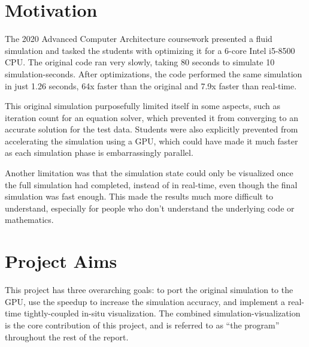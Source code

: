 \section{Motivation}
The 2020 Advanced Computer Architecture coursework presented a fluid simulation and tasked the students with optimizing it for a 6-core Intel i5-8500 CPU\cite{modules:CS257Coursework}.
The original code ran very slowly, taking 80 seconds to simulate 10 simulation-seconds.
After optimizations, the code performed the same simulation in just 1.26 seconds, 64x faster than the original and 7.9x faster than real-time\cite{modules:aca257submission}.

This original simulation purposefully limited itself in some aspects, such as iteration count for an equation solver, which prevented it from converging to an accurate solution for the test data.
Students were also explicitly prevented from accelerating the simulation using a GPU, which could have made it much faster as each simulation phase is embarrassingly parallel.

Another limitation was that the simulation state could only be visualized once the full simulation had completed,
instead of in real-time, even though the final simulation was fast enough.
This made the results much more difficult to understand, especially for people who don't understand the underlying code or mathematics.

\section{Project Aims}
This project has three overarching goals: to port the original simulation to the GPU, use the speedup to increase the simulation accuracy, and implement a real-time tightly-coupled in-situ visualization.
The combined simulation-visualization is the core contribution of this project, and is referred to as ``the program'' throughout the rest of the report.

